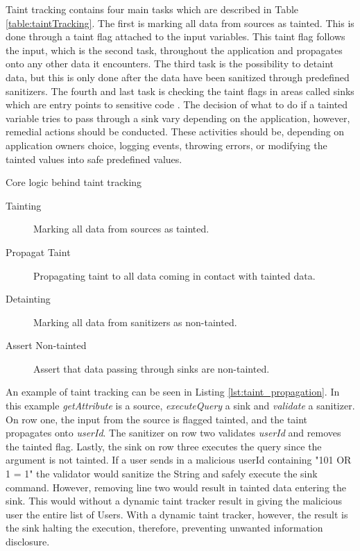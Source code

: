 Taint tracking contains four main tasks which are described in Table \ref{table:taintTracking}. The first is marking all data from sources as tainted. This is done through a taint flag attached to the input variables. This taint flag follows the input, which is the second task, throughout the application and propagates onto any other data it encounters. The third task is the possibility to detaint data, but this is only done after the data have been sanitized through predefined sanitizers. The fourth and last task is checking the taint flags in areas called sinks which are entry points to sensitive code \parencite{Pan2015, Venkataramani2008}. The decision of what to do if a tainted variable tries to pass through a sink vary depending on the application, however, remedial actions should be conducted. These activities should be, depending on application owners choice, logging events, throwing errors, or modifying the tainted values into safe predefined values. 

\begin{table}[H]
  \centering
  \caption{Core logic behind taint tracking}
  \label{table:taintTracking}
  \begin{description}
    \item [Tainting] Marking all data from sources as tainted.
    \item [Propagat Taint] Propagating taint to all data coming in contact with tainted data.
    \item [Detainting] Marking all data from sanitizers as non-tainted.
    \item [Assert Non-tainted] Assert that data passing through sinks are non-tainted. 
  \end{description}
\end{table}

An example of taint tracking can be seen in Listing \ref{lst:taint_propagation}. In this example \textit{getAttribute} is a source, \textit{executeQuery} a sink and \textit{validate} a sanitizer. On row one, the input from the source is flagged tainted, and the taint propagates onto \textit{userId}. The sanitizer on row two validates \textit{userId} and removes the tainted flag. Lastly, the sink on row three executes the query since the argument is not tainted. If a user sends in a malicious userId containing "101 OR 1 = 1" the validator would sanitize the String and safely execute the sink command. However, removing line two would result in tainted data entering the sink. This would without a dynamic taint tracker result in giving the malicious user the entire list of Users. With a dynamic taint tracker, however, the result is the sink halting the execution, therefore, preventing unwanted information disclosure.


